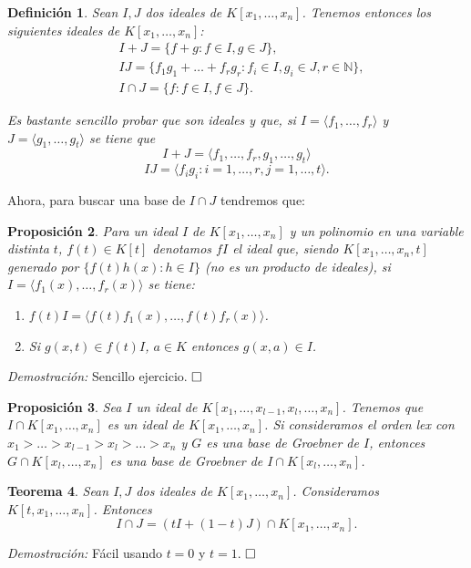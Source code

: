 \documentclass[12pt]{article}
\newtheorem{theorem}{Teorema}[section]
\newtheorem{proposition}[theorem]{Proposición}
\newtheorem{definition}[theorem]{Definición}
\begin{document}
\begin{definition}Sean $I,J$ dos ideales de $K[x_1, \ldots, x_n]$. Tenemos entonces los siguientes ideales de $K[x_1, \ldots, x_n]$:
\begin{align*}
&I+J= \lbrace f+g: f \in I, g \in J \rbrace, \\
&IJ= \lbrace f_1g_1 + \ldots + f_rg_r: f_i \in I, g_i \in J, r \in \mathbb{N} \rbrace, \\
&I\cap J= \lbrace f: f \in I, f \in J \rbrace.
\end{align*} 

Es bastante sencillo probar que son ideales y que, si $I = \langle f_1, \ldots, f_r \rangle $ y $J = \langle g_1, \ldots, g_t \rangle$ se tiene que $$ I+J = \langle f_1, \ldots, f_r, g_1, \ldots, g_t \rangle$$ $$ IJ= \langle f_ig_i: i=1, \ldots, r,j = 1, \ldots, t \rangle.$$
\end{definition}

Ahora, para buscar una base de $I \cap J$ tendremos que: 

\begin{proposition}Para un ideal $I$ de $K[x_1, \ldots, x_n]$ y un polinomio en una variable distinta $t$, $f(t) \in K[t]$ denotamos $fI$ el ideal que, siendo $K[x_1, \ldots, x_n,t]$ generado por $\lbrace f(t)h(x) : h \in I \rbrace$ (no es un producto de ideales), si $I = \langle f_1(x), \ldots, f_r(x) \rangle$ se tiene: 
\begin{enumerate}
\item $f(t) I= \langle f(t)f_1(x), \ldots, f(t)f_r(x) \rangle$.
\item Si $g(x,t) \in f(t)I$, $a \in K$ entonces $g(x,a) \in I$.
\end{enumerate}
\end{proposition}
\emph{Demostración: } Sencillo ejercicio.
$\hfill \square$

\begin{proposition}Sea $I$ un ideal de $K[x_1, \ldots, x_{l-1}, x_l, \ldots, x_n]$. Tenemos que $I \cap K[x_1, \ldots, x_n]$ es un ideal de $K[x_1, \ldots, x_n]$. Si consideramos el orden lex con $x_1 >\ldots >x_{l-1} >x_l > \ldots >x_n$ y $G$ es una base de Groebner de $I$, entonces $G \cap K[x_l, \ldots, x_n]$ es una base de Groebner de $I \cap K[x_l, \ldots, x_n]$. 
\end{proposition}

\begin{theorem}
Sean $I,J$ dos ideales de $K[x_1, \ldots, x_n]$. Consideramos $K[t, x_1, \ldots, x_n]$. Entonces $$I\cap J = (tI+(1-t)J) \cap K[x_1, \ldots, x_n].$$
\end{theorem}
\emph{Demostración: } Fácil usando $t=0$ y $t=1$.
$\hfill \square$
\end{document}
